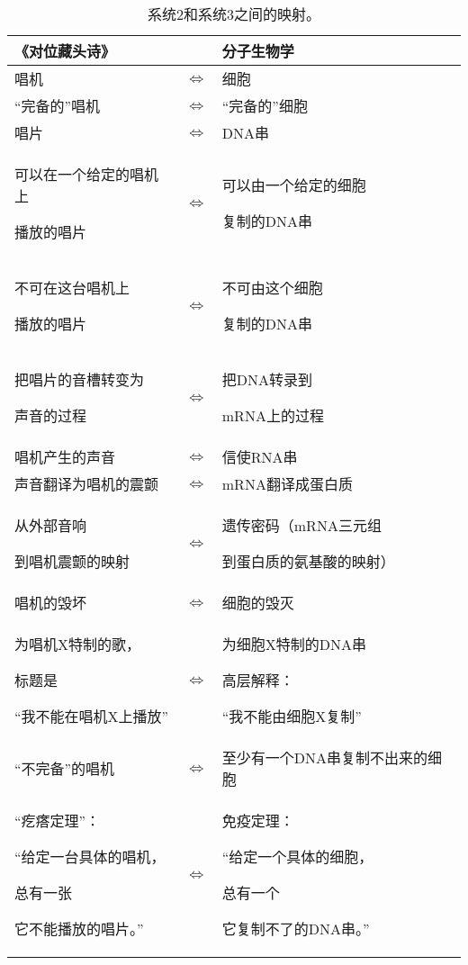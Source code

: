\begin{table}
\caption{系统2和系统3之间的映射。}\label{tab:2-3-mapping}
\begin{tabu}[c]{@{}X[r]cX[l]@{}}
\toprule
《对位藏头诗》 & & 分子生物学\\
\midrule
唱机 & $\iff$ & 细胞\\
“完备的”唱机 & $\iff$ & “完备的”细胞\\
唱片 & $\iff$ & DNA串\\
可以在一个给定的唱机上\par 播放的唱片 & $\iff$ & 可以由一个给定的细胞\par 复制的DNA串\strut\\
不可在这台唱机上\par 播放的唱片 & $\iff$ & 不可由这个细胞\par 复制的DNA串\strut\\
把唱片的音槽转变为\par 声音的过程 & $\iff$ & 把DNA转录到\par mRNA上的过程\strut\\
唱机产生的声音 & $\iff$ & 信使RNA串\\
声音翻译为唱机的震颤 & $\iff$ & mRNA翻译成蛋白质\\
从外部音响\par 到唱机震颤的映射 & $\iff$ & 遗传密码（mRNA三元组\par 到蛋白质的氨基酸的映射）\strut\\
唱机的毁坏 & $\iff$ & 细胞的毁灭\\
为唱机X特制的歌，\par 标题是\par “我不能在唱机X上播放” & $\iff$ & 为细胞X特制的DNA串\par 高层解释：\par “我不能由细胞X复制”\strut\\
“不完备”的唱机 & $\iff$ & 至少有一个DNA串复制不出来的细胞\strut\\
“疙瘩定理”：\par “给定一台具体的唱机，\par 总有一张\par 它不能播放的唱片。” & $\iff$ & 免疫定理：\par “给定一个具体的细胞，\par 总有一个\par 它复制不了的DNA串。”\strut\\
\bottomrule
\end{tabu}
\end{table}

